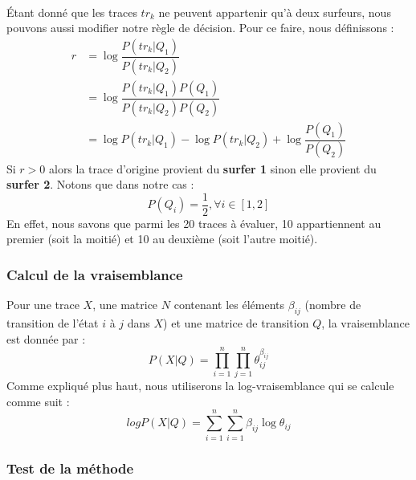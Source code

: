 \documentclass[a4paper,titlepage]{report}
\begin{document}
\paragraph{} 
Étant donné que les traces $tr_k$ ne peuvent appartenir qu'à deux surfeurs, nous pouvons aussi modifier notre règle de décision. Pour ce faire, nous définissons :
\[
\begin{aligned}
r &= \log \dfrac{P(tr_k|Q_1)}{P(tr_k|Q_2)}\\
&= \log \dfrac{P(tr_k|Q_1) P(Q_1)}{P(tr_k|Q_2) P(Q_2)}\\
&= \log P(tr_k|Q_1) - \log P(tr_k|Q_2) + \log \dfrac{P(Q_1)}{P(Q_2)}
\end{aligned}
\]
Si $r > 0$ alors la trace d'origine provient du \textbf{surfer 1} sinon elle provient du \textbf{surfer 2}. Notons que dans notre cas :
\[ 
	P(Q_i) = \frac{1}{2}, \forall i \in [1,2]
\]
En effet, nous savons que parmi les 20 traces à évaluer, 10 appartiennent au premier (soit la moitié) et 10 au deuxième (soit l'autre moitié).  
\subsubsection{Calcul de la vraisemblance}
Pour une trace $X$, une matrice $N$ contenant les éléments $\beta_{ij}$ (nombre de transition de l'état $i$ à $j$ dans $X$) et une matrice de transition $Q$, la vraisemblance est donnée par : 
\[
P(X|Q) = \prod\limits_{i = 1}^n \prod\limits_{j = 1}^n \theta_{ij}^{\beta_{ij}}
\]
Comme expliqué plus haut, nous utiliserons la log-vraisemblance qui se calcule comme suit :
\[
log P(X|Q) = \sum\limits_{i = 1}^n\sum\limits_{i = 1}^n \beta_{ij} \log \theta_{ij}
\]
\subsubsection{Test de la méthode}
\end{document}
